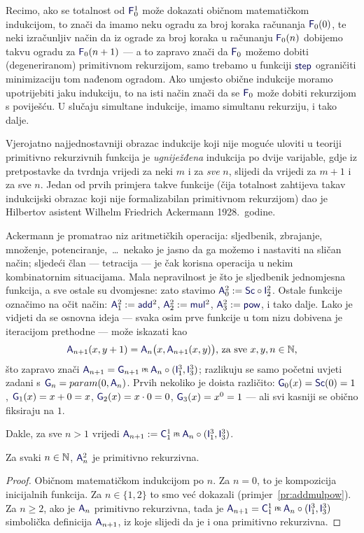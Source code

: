 Recimo, ako se totalnost od $\f F_0^1$ može dokazati običnom matematičkom indukcijom, to znači da imamo neku ogradu za broj koraka računanja $\f F_0(0)$, te neki izračunljiv način da iz ograde za broj koraka u računanju $\f F_0(n)$ dobijemo takvu ogradu za $\f F_0(n+1)$ --- a to zapravo znači da $\f F_0$ možemo dobiti (degeneriranom) primitivnom rekurzijom, samo trebamo u funkciji $\f{step}$ ograničiti minimizaciju tom nađenom ogradom. Ako umjesto obične indukcije moramo upotrijebiti jaku indukciju, to na isti način znači da se $\f F_0$ može dobiti rekurzijom s poviješću. U slučaju simultane indukcije, imamo simultanu rekurziju, i tako dalje.

Vjerojatno najjednostavniji obrazac indukcije koji nije moguće uloviti u teoriji primitivno rekurzivnih funkcija je \emph{ugniježđena} indukcija po dvije varijable, gdje iz pretpostavke da tvrdnja vrijedi za neki $m$ i za \emph{sve} $n$, slijedi da vrijedi za $m+1$ i za sve $n$. Jedan od prvih primjera takve funkcije (čija totalnost zahtijeva takav indukcijski obrazac koji nije formalizabilan primitivnom rekurzijom) dao je Hilbertov asistent Wilhelm Friedrich Ackermann 1928.\ godine.

Ackermann je promatrao niz aritmetičkih operacija: sljedbenik, zbrajanje, množenje, potenciranje,~\ldots\ nekako je jasno da ga možemo i nastaviti na sličan način; sljedeći član --- tetracija --- je čak korisna operacija u nekim kombinatornim situacijama. Mala nepravilnost je što je sljedbenik jednomjesna funkcija, a sve ostale su dvomjesne: zato stavimo $\f A_0^2:=\f{Sc}\circ \f I_2^2$. Ostale funkcije označimo na očit način: $\f A_1^2:=\f{add}^2$, $\f A_2^2:=\f{mul}^2$, $\f A_3^2:=\f{pow}$, i tako dalje. Lako je vidjeti da se osnovna ideja --- svaka osim prve funkcije u tom nizu dobivena je iteracijom prethodne --- može iskazati kao
\begin{equation}\label{eq:A2SSdef}
    \f A_{n+1}(x,y+1)=\f A_n\bigl(x,\f A_{n+1}(x,y)\bigr)\text{, za sve }x,y,n\in\N\text,
\end{equation}
što zapravo znači $\f A_{n+1}=\f G_{n+1}\pr\f A_n\circ(\f I_1^3,\f I_3^3)$; razlikuju se samo početni uvjeti zadani s $\f G_n=param(0,\f A_n)$. Prvih nekoliko je doista različito: $\f G_0(x)=\f{Sc}(0)=1$, $\f G_1(x)=x+0=x$, $\f G_2(x)=x\cdot 0=0$, $\f G_3(x)=x^0=1$ --- ali svi kasniji se obično fiksiraju na $1$.

Dakle, za sve $n>1$ vrijedi $\f A_{n+1}:=\f C_1^1\pr\f A_n\circ(\f I_1^3,\f I_3^3)$.

\begin{propozicija}\label{pp:Anprn}
    Za svaki $n\in{\mathbb N}$, $\f A_n^2$ je primitivno rekurzivna.
\end{propozicija}
\begin{proof}
Običnom matematičkom indukcijom po $n$. Za $n=0$, to je kompozicija inicijalnih funkcija. Za $n\in\{1,2\}$ to smo već dokazali (primjer~\ref{pr:addmulpow}). Za $n\ge 2$, ako je $\f A_n$ primitivno rekurzivna, tada je $\f A_{n+1}=\f C_1^1\pr\f A_n\circ(\f I_1^3,\f I_3^3)$ simbolička definicija $\f A_{n+1}$, iz koje slijedi da je i ona primitivno rekurzivna.
\end{proof}

